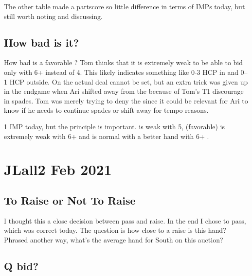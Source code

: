 \documentclass[tom-ari]{subfile}
\begin{document}
The other table made a partscore so little difference in terms of IMPs today, but still worth noting and discussing.

\section{How bad is it?}

\begin{handdiagram}
\end{handdiagram}


How bad is a favorable ?  Tom thinks that it is extremely weak to be able to bid only  with 6+ instead of 4.  This likely indicates something like 0-3 HCP in \sss and 0--1 HCP outside.  On the actual deal  cannot be set, but an extra trick was given up in the endgame when Ari shifted away from the  because of Tom's T1 discourage in spades.  Tom was merely trying to deny the  since it could be relevant for Ari to know if he needs to continue spades or shift away for tempo reasons.

1 IMP today, but the principle is important.   is weak with 5,  (favorable) is extremely weak with 6+ and  is normal with a better hand with 6+ \sss.

\chapter{JLall2 Feb 2021}

\section{To Raise or Not To Raise}
\begin{handdiagram}
\end{handdiagram}


I thought this a close decision between pass and raise.  In the end I chose to pass, which was correct today.  The question is how close to a raise is this hand?  Phrased another way, what's the average hand for South on this auction?

\section{Q bid?}
\begin{handdiagram}
\end{handdiagram}
\end{document}
